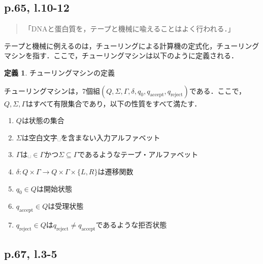 \documentclass[10pt, a5paper, twoside]{jsarticle}
\theoremstyle{definition}
\newtheorem{dfn}{定義}
\begin{document}
		\subsection{p.65, l.10-12}

			\begin{quote}

				「DNAと蛋白質を，テープと機械に喩えることはよく行われる．」
				
			\end{quote}

			テープと機械に例えるのは，チューリングによる計算機の定式化，チューリングマシンを指す．ここで，チューリングマシンは以下のように定義される\cite{sip2}．

			\begin{dfn}

				チューリングマシンの定義

				チューリングマシンは，7個組$(Q, \Sigma, \Gamma, \delta, q_0, q_{\mathrm{accept}}, q_{\mathrm{reject}})$である．ここで，$Q, \Sigma, \Gamma$はすべて有限集合であり，以下の性質をすべて満たす．

				\begin{enumerate}
					\item $Q$は状態の集合

					\item $\Sigma$は空白文字$␣$を含まない入力アルファベット

					\item $\Gamma$は$␣ \in \Gamma$かつ$\Sigma \subseteq \Gamma$であるようなテープ・アルファベット

					\item $\delta : Q \times \Gamma \to Q \times \Gamma \times \{ L, R \}$は遷移関数

					\item $q_0 \in Q$は開始状態

					\item $q_{\mathrm{accept}} \in Q$は受理状態

					\item $q_{\mathrm{reject}} \in Q$は$q_{\mathrm{reject}} \neq q_{\mathrm{accept}}$であるような拒否状態
				\end{enumerate}
				
			\end{dfn}

		\subsection{p.67, l.3-5}
\end{document}
